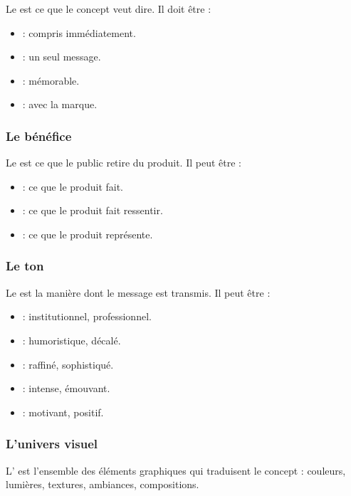 Le  est ce que le concept veut dire. Il doit être :

\begin{itemize}
    \item {} : compris immédiatement.
    \item {} : un seul message.
    \item {} : mémorable.
    \item {} : avec la marque.
\end{itemize}

\subsubsection{Le bénéfice}

Le  est ce que le public retire du produit. Il peut être :

\begin{itemize}
    \item {} : ce que le produit fait.
    \item {} : ce que le produit fait ressentir.
    \item {} : ce que le produit représente.
\end{itemize}

\subsubsection{Le ton}

Le  est la manière dont le message est transmis. Il peut être :

\begin{itemize}
    \item {} : institutionnel, professionnel.
    \item {} : humoristique, décalé.
    \item {} : raffiné, sophistiqué.
    \item {} : intense, émouvant.
    \item {} : motivant, positif.
\end{itemize}

\subsubsection{L'univers visuel}

L' est l'ensemble des éléments graphiques qui traduisent le concept : couleurs, lumières, textures, ambiances, compositions.

